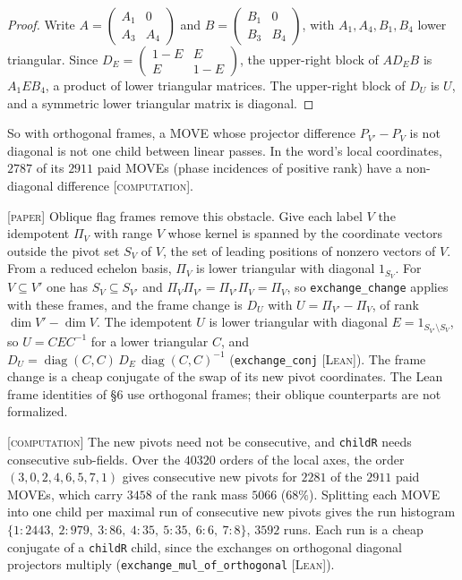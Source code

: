 \documentclass[11pt]{amsart}
\newcommand{\lean}[1]{\texttt{#1}}
\newcommand{\tagL}{\textsc{[Lean]}}
\newcommand{\tagP}{\textsc{[paper]}}
\newcommand{\tagC}{\textsc{[computation]}}
\begin{document}
\begin{proof}
Write $A = \begin{pmatrix} A_1 & 0\\ A_3 & A_4\end{pmatrix}$ and $B = \begin{pmatrix} B_1 &
0\\ B_3 & B_4\end{pmatrix}$, with $A_1, A_4, B_1, B_4$ lower triangular. Since $D_E =
\begin{pmatrix} 1-E & E\\ E & 1-E\end{pmatrix}$, the upper-right block of $A D_E B$ is $A_1 E B_4$,
a product of lower triangular matrices. The upper-right block of $D_U$ is $U$, and a symmetric lower
triangular matrix is diagonal.
\end{proof}

So with orthogonal frames, a MOVE whose projector difference $P_{V'} - P_V$ is not diagonal is not
one child between linear passes. In the word's local coordinates, $2787$ of its $2911$ paid MOVEs
(phase incidences of positive rank) have a non-diagonal difference \tagC.

\tagP{} Oblique flag frames remove this obstacle. Give each label $V$ the idempotent $\Pi_V$ with
range $V$ whose kernel is spanned by the coordinate vectors outside the pivot set $S_V$ of $V$, the
set of leading positions of nonzero vectors of $V$. From a reduced echelon basis, $\Pi_V$ is lower
triangular with diagonal $1_{S_V}$. For $V \subseteq V'$ one has $S_V \subseteq S_{V'}$ and
$\Pi_V \Pi_{V'} = \Pi_{V'} \Pi_V = \Pi_V$, so \lean{exchange\_change} applies with these frames,
and the frame change is $D_U$ with $U = \Pi_{V'} - \Pi_V$, of rank $\dim V' - \dim V$. The
idempotent $U$ is lower triangular with diagonal $E = 1_{S_{V'} \setminus S_V}$, so $U = C E
C^{-1}$ for a lower triangular $C$, and $D_U = \operatorname{diag}(C,C)\, D_E\,
\operatorname{diag}(C,C)^{-1}$ (\lean{exchange\_conj} \tagL{}). The frame change is a cheap
conjugate of the swap of its new pivot coordinates. The Lean frame identities of \S6 use orthogonal
frames; their oblique counterparts are not formalized.

\tagC{} The new pivots need not be consecutive, and \lean{childR} needs consecutive sub-fields.
Over the $40320$ orders of the local axes, the order $(3,0,2,4,6,5,7,1)$ gives consecutive new
pivots for $2281$ of the $2911$ paid MOVEs, which carry $3458$ of the rank mass $5066$ ($68\%$).
Splitting each MOVE into one child per maximal run of consecutive new pivots gives the run
histogram $\{1{:}2443,\ 2{:}979,\ 3{:}86,\ 4{:}35,\ 5{:}35,\ 6{:}6,\ 7{:}8\}$, $3592$ runs. Each run
is a cheap conjugate of a \lean{childR} child, since the exchanges on orthogonal diagonal
projectors multiply (\lean{exchange\_mul\_of\_orthogonal} \tagL{}).
\end{document}
